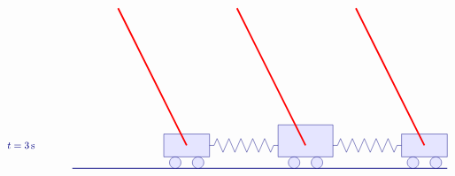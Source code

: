 \begin{solution}
\begin{itemize}
\begin{equation*}
\begin{tikzpicture}[scale=0.8, color=blue!50!black]
        \begin{scope}[yshift=-6cm]
          \draw (-3,1) node[right] {$t=3\s$};
          \draw[thick] (0,0) -- (16.4,0);
          \begin{scope}[xshift=2cm]
            \draw[fill=blue!10] (2,0.5) rectangle (4,1.5);
            \draw[fill=blue!10] (2.5,0.25) circle (0.25);
            \draw[fill=blue!10] (3.5,0.25) circle (0.25);
          \end{scope}
          \begin{scope}[xshift=7.2cm]
            \draw[fill=blue!10] (1.8,0.5) rectangle (4.2,1.9);
            \draw[fill=blue!10] (2.5,0.25) circle (0.25);
            \draw[fill=blue!10] (3.5,0.25) circle (0.25);
          \end{scope}
          \begin{scope}[xshift=12.4cm]
            \draw[fill=blue!10] (2,0.5) rectangle (4,1.5);
            \draw[fill=blue!10] (2.5,0.25) circle (0.25);
            \draw[fill=blue!10] (3.5,0.25) circle (0.25);
          \end{scope}
          \begin{scope}[xshift=6cm]
            \draw (0,1) -- ++(0.2,0) -- ++(0.13,0.3)
            -- ++(0.26,-0.6) -- ++(0.26,0.6)
            -- ++(0.26,-0.6) -- ++(0.26,0.6)
            -- ++(0.26,-0.6) -- ++(0.26,0.6)
            -- ++(0.26,-0.6) -- ++(0.26,0.6)
            -- ++(0.26,-0.6) -- ++(0.13,0.3)
            -- ++(0.2,0);
          \end{scope}
          \begin{scope}[xshift=11.4cm]
            \draw (0,1) -- ++(0.2,0) -- ++(0.13,0.3)
            -- ++(0.26,-0.6) -- ++(0.26,0.6)
            -- ++(0.26,-0.6) -- ++(0.26,0.6)
            -- ++(0.26,-0.6) -- ++(0.26,0.6)
            -- ++(0.26,-0.6) -- ++(0.26,0.6)
            -- ++(0.26,-0.6) -- ++(0.13,0.3)
            -- ++(0.2,0);
          \end{scope}
        \end{scope}
        \begin{scope}[xshift=3cm,yshift=1cm,rotate=-90]
          \draw[ultra thick, red] (0,-1) -- (6,2);
        \end{scope}
        \begin{scope}[xshift=8.2cm,yshift=1cm,rotate=-90]
          \draw[ultra thick, red] (0,-1) -- (6,2);
        \end{scope}
        \begin{scope}[xshift=13.4cm,yshift=1cm,rotate=-90]
          \draw[ultra thick, red] (0,-1) -- (6,2);

\end{scope}
\end{tikzpicture}
\end{equation*}
\end{itemize}
\end{solution}
